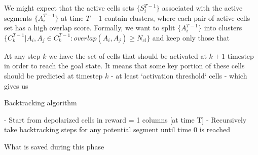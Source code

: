 \documentclass[a4paper]{article}
\begin{document}
We might expect that the active cells sets $\{S_i^{T-1}\}$ associated with the active segments $\{A_i^{T-1}\}$ at time $T-1$ contain clusters, where each pair of active cells set has a high overlap score. Formally, we want to split $\{A_i^{T-1}\}$ into clusters $\{C_k^{T-1}| A_i, A_j \in C_k^{T-1}: overlap(A_i, A_j) \geq N_{cl}\}$ and keep only those that 

At any step $k$ we have the set of cells that should be activated at $k+1$ timestep in order to reach the goal state. It means that some key portion of these cells should be predicted at timestep $k$ - at least `activation threshold` cells - which gives us


Backtracking algorithm

- Start from depolarized cells in reward = 1 columns [at time T]
- Recursively take backtracking steps for any potential segment until time 0 is reached



What is saved during this phase

\end{document}
